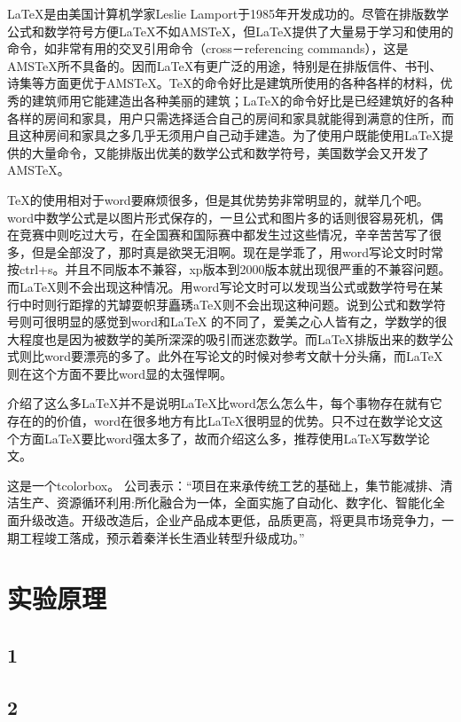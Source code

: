 \documentclass[UTF8,12pt,a4paper]{article}
\begin{document}
LaTeX是由美国计算机学家Leslie Lamport于1985年开发成功的。尽管在排版数学公式和数学符号方便LaTeX不如AMSTeX，但LaTeX提供了大量易于学习和使用的命令，如非常有用的交叉引用命令（cross－referencing commands），这是AMSTeX所不具备的。因而LaTeX有更广泛的用途，特别是在排版信件、书刊、诗集等方面更优于AMSTeX。TeX的命令好比是建筑所使用的各种各样的材料，优秀的建筑师用它能建造出各种美丽的建筑；LaTeX的命令好比是已经建筑好的各种各样的房间和家具，用户只需选择适合自己的房间和家具就能得到满意的住所，而且这种房间和家具之多几乎无须用户自己动手建造。为了使用户既能使用LaTeX提供的大量命令，又能排版出优美的数学公式和数学符号，美国数学会又开发了AMSTeX。

TeX的使用相对于word要麻烦很多，但是其优势势非常明显的，就举几个吧。word中数学公式是以图片形式保存的，一旦公式和图片多的话则很容易死机，偶在竞赛中则吃过大亏，在全国赛和国际赛中都发生过这些情况，辛辛苦苦写了很多，但是全部没了，那时真是欲哭无泪啊。现在是学乖了，用word写论文时时常按ctrl+s。并且不同版本不兼容，xp版本到2000版本就出现很严重的不兼容问题。而LaTeX则不会出现这种情况。用word写论文时可以发现当公式或数学符号在某行中时则行距撑的艽罅耍帜芽矗琇aTeX则不会出现这种问题。说到公式和数学符号则可很明显的感觉到word和LaTeX 的不同了，爱美之心人皆有之，学数学的很大程度也是因为被数学的美所深深的吸引而迷恋数学。而LaTeX排版出来的数学公式则比word要漂亮的多了。此外在写论文的时候对参考文献十分头痛，而LaTeX则在这个方面不要比word显的太强悍啊。

介绍了这么多LaTeX并不是说明LaTeX比word怎么怎么牛，每个事物存在就有它存在的的价值，word在很多地方有比LaTeX很明显的优势。只不过在数学论文这个方面LaTeX要比word强太多了，故而介绍这么多，推荐使用LaTeX写数学论文。

\vspace{0.5em}\noindent%
\begin{tcolorbox}
	这是一个tcolorbox。
	公司表示：“项目在来承传统工艺的基础上，集节能减排、清洁生产、资源循环利用:所化融合为一体，全面实施了自动化、数字化、智能化全面升级改造。开级改造后，企业产品成本更低，品质更高，将更具市场竞争力，一期工程竣工落成，预示着秦洋长生酒业转型升级成功。”
\end{tcolorbox}

\section{实验原理}
\subsection{1}
\subsection{2}
\end{document}
